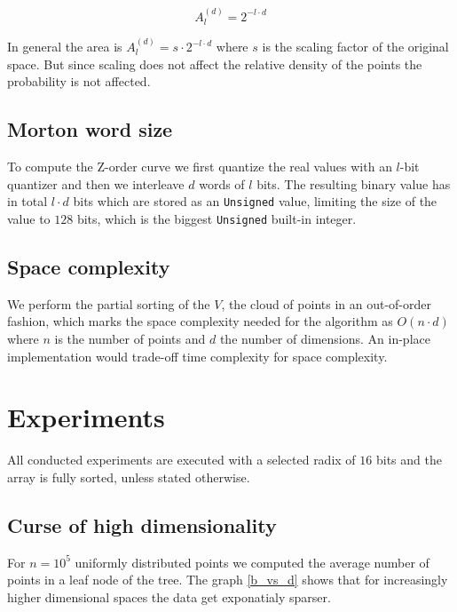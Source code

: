 \documentclass{juliacon}
\begin{document}
$$A^{(d)}_l = 2^{-l \cdot d}$$

In general the area is $A^{(d)}_l = s\cdot 2^{-l \cdot d}$ where $s$ is the scaling factor
of the original space. But since scaling does not affect the relative density of the
points the probability is not affected.

\subsection{Morton word size}
To compute the Z-order curve we first quantize the real values with an $l$-bit
quantizer and then we interleave $d$ words of $l$ bits. The resulting binary value has in
total $l\cdot d$ bits which are stored as an \verb|Unsigned| value, limiting the size of the
value to $128$ bits, which is the biggest \verb|Unsigned| built-in integer.

\subsection{Space complexity}
We perform the partial sorting of the $V$, the cloud of points in an out-of-order fashion,
which marks the space complexity needed for the algorithm as $O(n\cdot d)$ where $n$ is
the number of points and $d$ the number of dimensions. An in-place implementation would
trade-off time complexity for space complexity.


\section{Experiments}
All conducted experiments are executed with a selected radix of $16$ bits and the array
is fully sorted, unless stated otherwise.


\subsection{Curse of high dimensionality}
For $n=10^5$ uniformly distributed points we computed the average number of points in a
leaf node of the tree. The graph \ref{b_vs_d} shows that for increasingly higher
dimensional spaces the data get exponatialy sparser.
\end{document}
